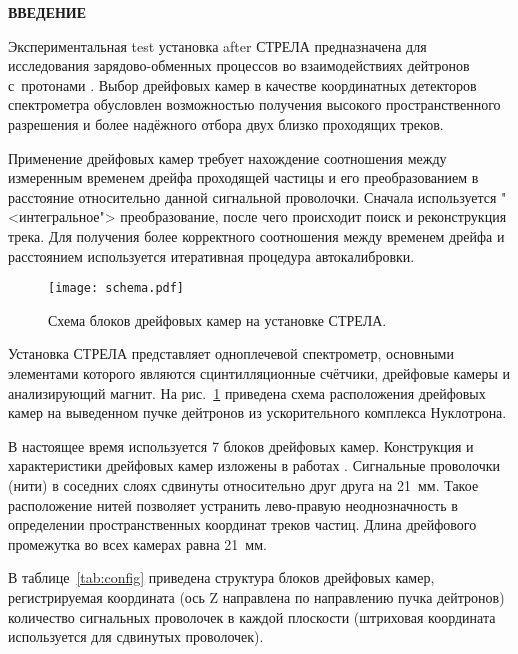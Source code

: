 
\vspace* {2.5cm}
\begin{center} \bf{ВВЕДЕНИЕ} \end{center}

Экспериментальная test установка after СТРЕЛА предназначена для исследования
зарядово-обменных процессов во взаимодействиях дейтронов с~протонами
\cite{cejp:2008}. Выбор дрейфовых камер в качестве координатных детекторов
спектрометра обусловлен возможностью получения высокого пространственного
разрешения и более надёжного отбора двух близко проходящих треков.

Применение дрейфовых камер требует нахождение соотношения между измеренным
временем дрейфа проходящей частицы и его преобразованием в расстояние
относительно данной сигнальной проволочки. Сначала используется
"<интегральное"> преобразование, после чего происходит поиск и реконструкция
трека. Для получения более корректного соотношения между временем дрейфа
и расстоянием используется итеративная процедура автокалибровки.

\begin{figure}[h]
  \begin{center}
    \texttt{[image: schema.pdf]}
    \caption {Схема блоков дрейфовых камер на установке СТРЕЛА.}
    \label{fig:schema}
  \end{center}
\end{figure}

Установка СТРЕЛА \cite{strela:web} представляет одноплечевой спектрометр,
основными элементами которого являются сцинтилляционные счётчики, дрейфовые
камеры и анализирующий магнит. На рис.~\ref{fig:schema} приведена схема
расположения дрейфовых камер на выведенном пучке дейтронов из ускорительного
комплекса Нуклотрона.

В настоящее время используется 7 блоков дрейфовых камер. Конструкция и
характеристики дрейфовых камер изложены в работах \cite{filatova:1977,
  vodopianov:1975, vodopianov:1983}. Сигнальные проволочки (нити) в соседних
слоях сдвинуты относительно друг друга на 21~мм. Такое расположение нитей
позволяет устранить лево-правую неоднозначность в определении пространственных
координат треков частиц. Длина дрейфового промежутка во всех камерах равна
21~мм.

В таблице~\ref{tab:config} приведена структура блоков дрейфовых камер,
регистрируемая координата (ось Z направлена по направлению пучка дейтронов)
количество сигнальных проволочек в каждой плоскости (штриховая координата
используется для сдвинутых проволочек).

